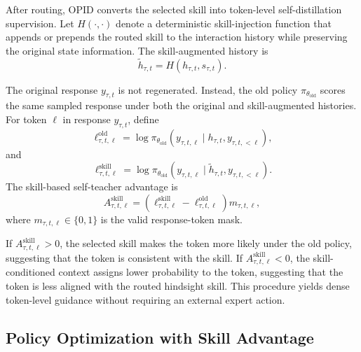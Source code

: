 After routing, OPID{} converts the selected skill into token-level self-distillation supervision. Let $H(\cdot,\cdot)$ denote a deterministic skill-injection function that appends or prepends the routed skill to the interaction history while preserving the original state information. The skill-augmented history is
\begin{equation*}
    \tilde{h}_{\tau,t} = H(h_{\tau,t}, s_{\tau,t}).
\end{equation*}

The original response $y_{\tau,t}$ is not regenerated. Instead, the old policy $\pi_{\theta_{\mathrm{old}}}$ scores the same sampled response under both the original and skill-augmented histories. For token $\ell$ in response $y_{\tau,t}$, define
\begin{equation*}
    \ell^{\mathrm{old}}_{\tau,t,\ell}
    =
    \log \pi_{\theta_{\mathrm{old}}}
    \left(
        y_{\tau,t,\ell}
        \mid
        h_{\tau,t}, y_{\tau,t,<\ell}
    \right),
\end{equation*}
and
\begin{equation*}
    \ell^{\mathrm{skill}}_{\tau,t,\ell}
    =
    \log \pi_{\theta_{\mathrm{old}}}
    \left(
        y_{\tau,t,\ell}
        \mid
        \tilde{h}_{\tau,t}, y_{\tau,t,<\ell}
    \right).
\end{equation*}
The skill-based self-teacher advantage is
\begin{equation*}
    A^{\mathrm{skill}}_{\tau,t,\ell}
    =
    \left(
        \ell^{\mathrm{skill}}_{\tau,t,\ell}
        -
        \ell^{\mathrm{old}}_{\tau,t,\ell}
    \right)
    m_{\tau,t,\ell},
\end{equation*}
where $m_{\tau,t,\ell}\in\{0,1\}$ is the valid response-token mask.

If $A^{\mathrm{skill}}_{\tau,t,\ell}>0$, the selected skill makes the token more likely under the old policy, suggesting that the token is consistent with the skill. If \(A^{\mathrm{skill}}_{\tau,t,\ell}<0\), the skill-conditioned context assigns lower probability to the token, suggesting that the token is less aligned with the routed hindsight skill. This procedure yields dense token-level guidance without requiring an external expert action.

\subsection{Policy Optimization with Skill Advantage}

